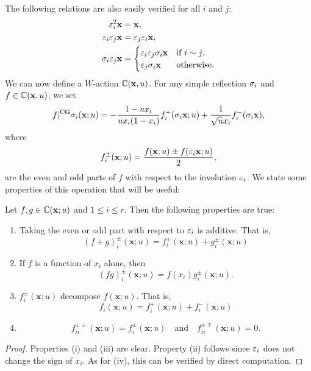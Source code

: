 \documentclass[12pt,reqno,oneside]{amsart}
\begin{document}
        The following relations are also easily verified for all $i$ and $j$:
        \begin{equation}\label{equ:relations_for_action_of_signs_on_tuples}
            \begin{aligned}
                \varepsilon_{i}^{2}\mathbf{x} &= \mathbf{x}, \\
                \varepsilon_{i}\varepsilon_{j}\mathbf{x} &= \varepsilon_{j}\varepsilon_{i}\mathbf{x}, \\
                \sigma_{i}\varepsilon_{j}\mathbf{x} &= \begin{cases} \varepsilon_{i}\varepsilon_{j}\sigma_{i}\mathbf{x} & \text{if $i \sim j$}, \\ \varepsilon_{j}\sigma_{i}\mathbf{x} & \text{otherwise}. \end{cases}
            \end{aligned}
        \end{equation}
        We can now define a $W$-action $\mathbb{C}(\mathbf{x},u)$. For any simple reflection $\sigma_{i}$ and $f \in \mathbb{C}(\mathbf{x},u)$, we set
        \[
            f|^{\mathrm{CG}}\sigma_{i}(\mathbf{x};u) = -\frac{1-ux_{i}}{ux_{i}(1-x_{i})}f_{i}^{+}(\sigma_{i}\mathbf{x};u)+\frac{1}{\sqrt{u}x_{i}}f_{i}^{-}(\sigma_{i}\mathbf{x}),
        \]
        where
        \[
            f_{i}^{\pm}(\mathbf{x};u) = \frac{f(\mathbf{x};u) \pm f(\varepsilon_{i}\mathbf{x};u)}{2},
        \]
        are the even and odd parts of $f$ with respect to the involution $\varepsilon_{i}$. We state some properties of this operation that will be useful:
        
        \begin{proposition}\label{prop:pm_properties}
            Let $f,g \in \mathbb{C}(\mathbf{x};u)$ and $1 \le i \le r$. Then the following properties are true:
            \begin{enumerate}[label=(\roman*)]
                \item Taking the even or odd part with respect to $\varepsilon_{i}$ is additive. That is,
                \[
                    (f+g)_{i}^{\pm}(\mathbf{x};u) = f_{i}^{\pm}(\mathbf{x};u)+g_{i}^{\pm}(\mathbf{x};u)
                \]
                \item If $f$ is a function of $x_{i}$ alone, then
                \[
                    (fg)_{i}^{\pm}(\mathbf{x};u) = f(x_{i})g_{i}^{\pm}(\mathbf{x};u).
                \]
                \item $f_{i}^{\pm}(\mathbf{x};u)$ decompose $f(\mathbf{x};u)$. That is,
                \[
                    f_{i}(\mathbf{x};u) = f_{i}^{+}(\mathbf{x};u)+f_{i}^{-}(\mathbf{x};u)
                \]
                \item 
                \[
                    f_{ii}^{\pm\pm}(\mathbf{x};u) = f_{i}^{\pm}(\mathbf{x};u) \quad \text{and} \quad f_{ii}^{\pm\mp}(\mathbf{x};u) = 0.
                \]
            \end{enumerate}
        \end{proposition}
        \begin{proof}
            Properties (i) and (iii) are clear. Property (ii) follows since $\varepsilon_{i}$ does not change the sign of $x_{i}$. As for (iv), this can be verified by direct computation.
        \end{proof}
\end{document}
